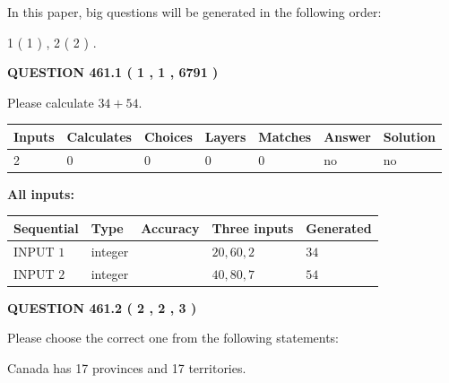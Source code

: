 \documentclass[12pt]{article}
\begin{document}
In this paper, big questions will be generated in the following order: 
   
   
   1 ( 1 )
 ,
   2 ( 2 )
 .
  
\vspace{0.2in}
  
{\textbf{\Large{QUESTION
461.1 
 ( 1 , 1 , 6791 )
}}}
  
  
 
Please calculate $ %
34 +  %
54 $.
 
 
   
   
   
   
\noindent\begin{tabular}{|l|l|l|l|l|l|l|}
 \hline
Inputs & Calculates & Choices & Layers & Matches & Answer & Solution \\ \hline
 2  & 
 0  & 
 0
  & 
 0  & 
 0  & 
  no & 
  no 
  \\ \hline
 \end{tabular}
   
   
   
   
\noindent{}
   
   
   
   
\noindent\vspace{0.1in}\hspace{-0.08in} {\textbf{\Large{All inputs: }}}
   
   
  
  
\noindent\begin{tabular}{|l|l|l|l|l|}
\hline
 Sequential & Type & Accuracy & Three inputs & Generated \\ 
\hline
 
 
  INPUT $  1 $ & integer &  & $
 20
 , 
 60
 , 
 2
 $ & $ 34 $ 
 \\  \hline  
 
 
  INPUT $  2 $ & integer &  & $
 40
 , 
 80
 , 
 7
 $ & $ 54 $ 
 \\  \hline  
 \end{tabular}
   
   
  
\vspace{0.2in}
  
{\textbf{\Large{QUESTION
461.2 
 ( 2 , 2 , 3 )
}}}
  
  
Please choose the correct one from the following statements:
 
 
Canada has  17 provinces and  17 territories.
 
\end{document}
